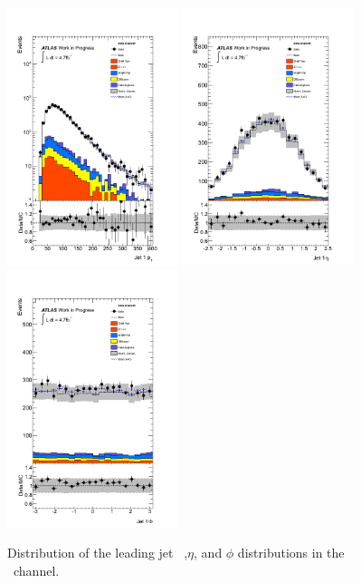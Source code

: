 \begin{figure}[htbp!]
     \begin{center}
     \includegraphics[width=50mm]{f/emu_jet1_pt_central_double}
     \includegraphics[width=50mm]{f/emu_jet1_eta_central_double}
     \includegraphics[width=50mm]{f/emu_jet1_phi_central_double}
     \end{center}
     \caption{Distribution of the leading jet \pt\ ,$\eta$, and $\phi$ distributions in the \emu\ channel.}
     \label{fig:dilep_jet1_emu}
    \end{figure}

